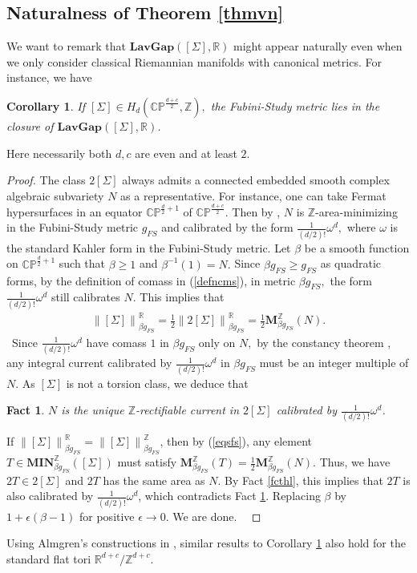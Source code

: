 \documentclass[11pt,a4paper]{amsart}
\numberwithin{equation}{section}
\newcommand{\mn}{\mathbf{MIN}}
\newcommand{\be}{\beta}
\newcommand{\e}{\epsilon}
\newcommand{\lag}{\mathbf{LavGap}}
\newcommand{\om}{\omega}
\newcommand{\Si}{\Sigma}
\newcommand{\ms}{\mathbf{M}}
\newcommand{\no}[1]{\left\lVert#1\right\rVert}
\newcommand{\m}{^{-1}}
\newcommand{\R}{\mathbb{R}}
\newcommand{\Z}{\mathbb{Z}}
\theoremstyle{plain}
\newtheorem{cor}{Corollary}[subsection]
\newtheorem{fact}{Fact}[subsection]
\theoremstyle{definition}
\numberwithin{equation}{subsection}
\begin{document}
	\subsection{Naturalness of Theorem \ref{thmvn}}
	We want to remark that $\lag([\Si],\R)$ might appear naturally even when we only consider classical Riemannian manifolds with canonical metrics. For instance, we have
	\begin{cor}\label{corcp}
		If $[\Si]\in H_d(\mathbb{CP}^{\frac{d+c}{2}},\Z),$ the Fubini-Study metric lies in the closure of $\lag([\Si],\R)$.
	\end{cor}
	Here necessarily both $d,c$ are even and at least $2.$
	\begin{proof}
		The class $2[\Si]$ always admits a connected embedded smooth complex algebraic subvariety $N$ as a representative. For instance, one can take Fermat hypersurfaces in an equator $\mathbb{CP}^{\frac{d}{2}+1}$ of $\mathbb{CP}^{\frac{d+c}{2}}.$ Then by \cite[page 70 Example I]{HL}, $N$ is $\Z$-area-minimizing in the Fubini-Study metric $g_{FS}$ and calibrated by the form $\frac{1}{(d/2)!}\om^d,$ where $\om$ is the standard Kahler form in the Fubini-Study metric. Let $\be$ be a smooth function on $\mathbb{CP}^{\frac{d}{2}+1}$ such that $\be\ge 1$ and $\be\m(1)=N.$ Since $\be g_{FS}\ge g_{FS}$ as quadratic forms, by the definition of comass in (\ref{defncms}), in metric $\be g_{FS},$ the form $\frac{1}{(d/2)!}\om^d$ still calibrates $N$. This implies that 
		\begin{align}\label{eqsfs}
			\no{[\Si]}_{\be g_{FS}}^{\R}=\frac{1}{2}\no{2[\Si]}_{\be g_{FS}}^{\R}=\frac{1}{2}\ms_{\be g_{FS}}^{\Z}(N).
		\end{align}  Since $\frac{1}{(d/2)!}\om^d$ have comass $1$ in $\be g_{FS}$ only on $N,$ by the constancy theorem \cite[Section 4.9]{FMgmt}, any integral current calibrated by $\frac{1}{(d/2)!}\om^d$ in $\be g_{FS}$ must be an integer multiple of $N$. As $[\Si]$ is not a torsion class, we deduce that 
		\begin{fact}\label{fctnc}
			$N$ is the unique $\Z$-rectifiable current in $2[\Si]$ calibrated by $\frac{1}{(d/2)!}\om^d$.
		\end{fact} If $\no{[\Si]}^{\R}_{\be g_{FS}}=\no{[\Si]}^{\Z}_{\be g_{FS}}$, then by (\ref{eqsfs}), any element $T\in\mn_{\be g_{FS}}^{\Z}([\Si])$ must satisfy $\ms_{\be g_{FS}}^{\Z}(T)=\frac{1}{2}\ms_{\be g_{FS}}^{\Z}(N).$ Thus, we have $2T\in 2[\Si]$ and $2T$ has the same area as $N.$ By Fact \ref{fcthl}, this implies that $2T$ is also calibrated by $\frac{1}{(d/2)!}\om^d$, which contradicts Fact \ref{fctnc}. Replacing $\be$ by $1+\e(\be-1)$ for positive $\e\to0$. We are done.  
	\end{proof}
	Using Almgren's constructions in \cite[Section 5.11]{HF}, similar results to Corollary \ref{corcp} also hold for the standard flat tori $\R^{d+c}/\Z^{d+c}.$
\end{document}
